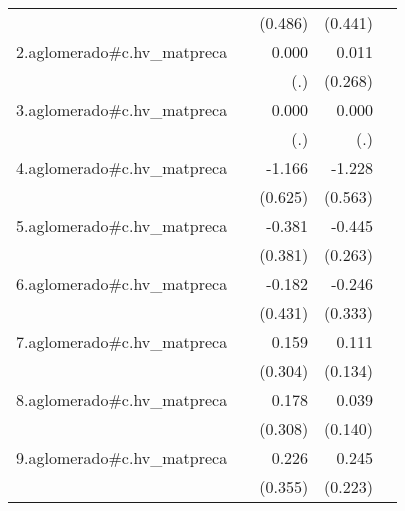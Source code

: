 {\begin{longtable}{l*{4}{D{.}{.}{-1}}}
            &                     &     (0.486)         &     (0.441)         &                     \\
\addlinespace
2.aglomerado#c.hv\_matpreca&                     &       0.000         &       0.011         &                     \\
            &                     &         (.)         &     (0.268)         &                     \\
\addlinespace
3.aglomerado#c.hv\_matpreca&                     &       0.000         &       0.000         &                     \\
            &                     &         (.)         &         (.)         &                     \\
\addlinespace
4.aglomerado#c.hv\_matpreca&                     &      -1.166         &      -1.228\sym{*}  &                     \\
            &                     &     (0.625)         &     (0.563)         &                     \\
\addlinespace
5.aglomerado#c.hv\_matpreca&                     &      -0.381         &      -0.445         &                     \\
            &                     &     (0.381)         &     (0.263)         &                     \\
\addlinespace
6.aglomerado#c.hv\_matpreca&                     &      -0.182         &      -0.246         &                     \\
            &                     &     (0.431)         &     (0.333)         &                     \\
\addlinespace
7.aglomerado#c.hv\_matpreca&                     &       0.159         &       0.111         &                     \\
            &                     &     (0.304)         &     (0.134)         &                     \\
\addlinespace
8.aglomerado#c.hv\_matpreca&                     &       0.178         &       0.039         &                     \\
            &                     &     (0.308)         &     (0.140)         &                     \\
\addlinespace
9.aglomerado#c.hv\_matpreca&                     &       0.226         &       0.245         &                     \\
            &                     &     (0.355)         &     (0.223)         &                     \\

\end{longtable}}
